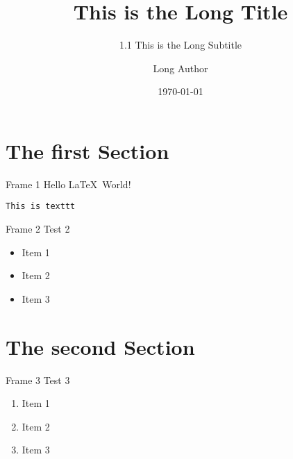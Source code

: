 \documentclass[aspectratio=169]{beamer}
\title[Short Title]{This is the Long Title}
\subtitle[1.1 Short Subtitle]{1.1 This is the Long Subtitle}
\author[Short Author]{Long Author}
\date{\today}
\begin{document}
    
    \maketitle
    
    \section[First Section]{The first Section}

    \begin{frame}{Frame 1}
        Hello \LaTeX\ World! 
        
        \texttt{This is texttt}
    \end{frame}

    \begin{frame}{Frame 2}
        Test 2
        \begin{itemize}
            \item Item 1
            \item Item 2
            \item Item 3
        \end{itemize}
    \end{frame}

    \section[Second Section]{The second Section}

    \begin{frame}{Frame 3}
        Test 3
        \begin{enumerate}
            \item Item 1
            \item Item 2
            \item Item 3
        \end{enumerate}
    \end{frame}
\end{document}
